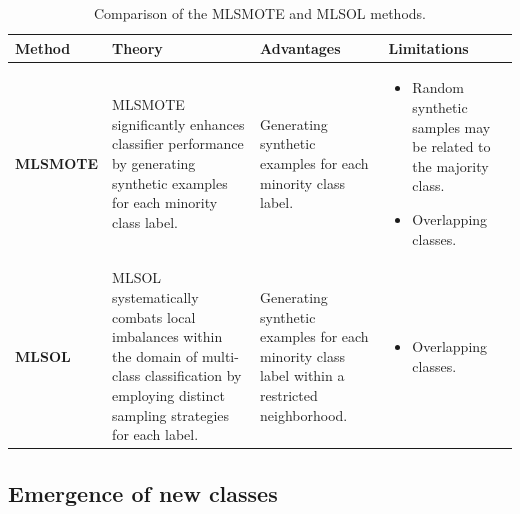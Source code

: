 \begin{table}[!ht]

    \centering
    \caption{Comparison of the MLSMOTE and MLSOL methods.}
    \label{table:imbalanced}

    \small %
    \renewcommand{\arraystretch}{1} %
    \setlength{\tabcolsep}{4pt} %
    \setlength{\arrayrulewidth}{0.15mm}

    \begin{tabularx}{\textwidth}{|>{\centering\arraybackslash\bfseries}p{2cm}|
                                       >{\raggedright\arraybackslash}X|
                                       >{\raggedright\arraybackslash}X|
                                       >{\raggedright\arraybackslash}X|}
    \hline
    \textbf{Method} & \textbf{Theory} & \textbf{Advantages} & \textbf{Limitations} \\ 
    \hline
    \textbf{MLSMOTE} & 
    MLSMOTE significantly enhances classifier performance by generating synthetic examples for each minority class label. & 
    Generating synthetic examples for each minority class label. & 
    \begin{itemize}[leftmargin=*]
        \item Random synthetic samples may be related to the majority class.
        \item Overlapping classes.
    \end{itemize} \\ 
    \hline
    \textbf{MLSOL} & 
    MLSOL systematically combats local imbalances within the domain of multi-class classification by employing distinct sampling strategies for each label. & 
    Generating synthetic examples for each minority class label within a restricted neighborhood. & 
    \begin{itemize}[leftmargin=*]
        \item Overlapping classes.
    \end{itemize} \\
    \hline
    \end{tabularx}
    \end{table}










\subsection{Emergence of new classes}
\label{sec:3_6_2_related_work_emergence}


